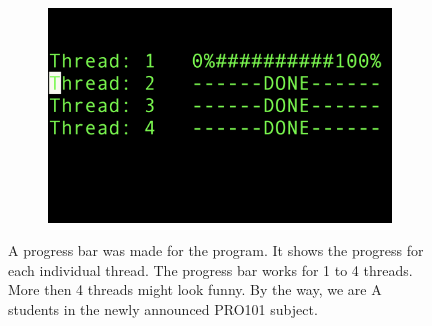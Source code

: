 \begin{figure}[H]
\begin{subfigure}{0.19\textwidth}
    \end{subfigure}
    ~ 
    \begin{subfigure}{0.19\textwidth}
        \centering
        \includegraphics[width=1.11\linewidth]{method/bilder/5}
    \end{subfigure}
    \caption{A progress bar was made for the program. It shows the progress for each individual thread. The progress bar works for 1 to 4 threads. More then 4 threads might look funny. By the way, we are A students in the newly announced PRO101 subject. }
    \label{fig:progress}
\end{figure}
\footnotemark
{}
